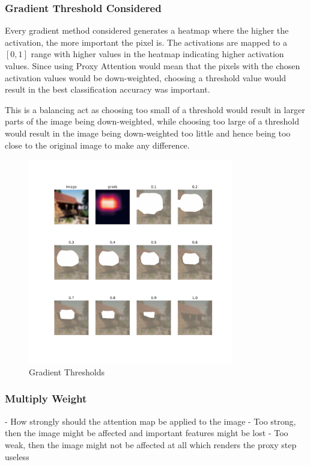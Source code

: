 \subsubsection{Gradient Threshold Considered}
Every gradient method considered generates a heatmap where the higher the activation, the more important the pixel is. The activations are mapped to a $[0,1]$ range with higher values in the heatmap indicating higher activation values. Since using Proxy Attention would mean that the pixels with the chosen activation values would be down-weighted, choosing a threshold value would result in the best classification accuracy was important.

This is a balancing act as choosing too small of a threshold would result in larger parts of the image being down-weighted, while choosing too large of a threshold would result in the image being down-weighted too little and hence being too close to the original image to make any difference.

\begin{figure}[h]
    \centering
    \includegraphics[width=0.8\textwidth]{images/grad_threshold.pdf}
	\caption{Gradient Thresholds}
    \label{fig:thresholds}
\end{figure}

\subsubsection{Multiply Weight}
- How strongly should the attention map be applied to the image
- Too strong, then the image might be affected and important features might be lost
- Too weak, then the image might not be affected at all which renders the proxy step useless

